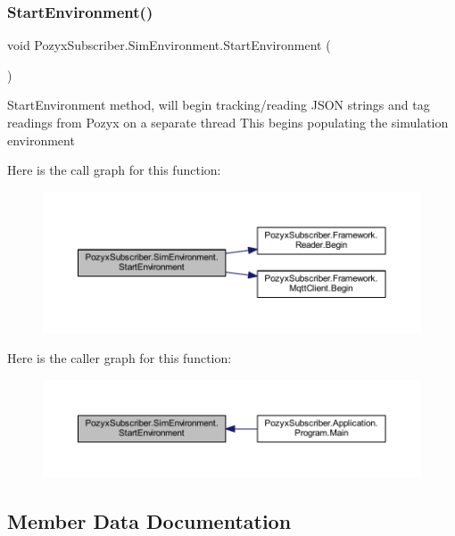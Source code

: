 \subsubsection{\texorpdfstring{Start\+Environment()}{StartEnvironment()}}
{\footnotesize\ttfamily void Pozyx\+Subscriber.\+Sim\+Environment.\+Start\+Environment (\begin{DoxyParamCaption}{ }\end{DoxyParamCaption})}



Start\+Environment method, will begin tracking/reading J\+S\+ON strings and tag readings from Pozyx on a separate thread This begins populating the simulation environment 

Here is the call graph for this function\+:
\nopagebreak
\begin{figure}[H]
\begin{center}
\leavevmode
\includegraphics[width=350pt]{class_pozyx_subscriber_1_1_sim_environment_a1804d91547ecc65c02091d63e8c1163e_cgraph}
\end{center}
\end{figure}
Here is the caller graph for this function\+:
\nopagebreak
\begin{figure}[H]
\begin{center}
\leavevmode
\includegraphics[width=350pt]{class_pozyx_subscriber_1_1_sim_environment_a1804d91547ecc65c02091d63e8c1163e_icgraph}
\end{center}
\end{figure}


\subsection{Member Data Documentation}
\mbox{\label{class_pozyx_subscriber_1_1_sim_environment_a71e86b3047a367d0bfd08c92ce480509}} 
